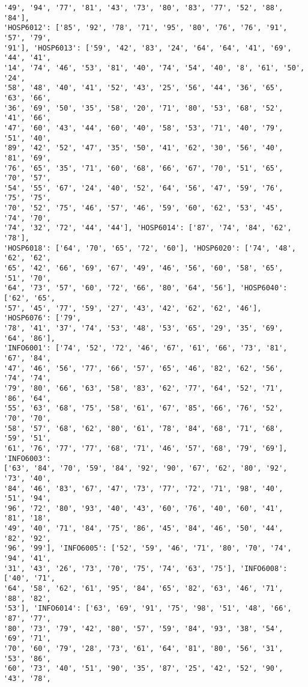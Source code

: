 \documentclass[11pt]{article}
\begin{document}
\begin{Verbatim}[commandchars=\\\{\}]
'49', '94', '77', '81', '43', '73', '80', '83', '77', '52', '88', '84'],
'HOSP6012': ['85', '92', '78', '71', '95', '80', '76', '76', '91', '57', '79',
'91'], 'HOSP6013': ['59', '42', '83', '24', '64', '64', '41', '69', '44', '41',
'14', '74', '46', '53', '81', '40', '74', '54', '40', '8', '61', '50', '24',
'58', '48', '40', '41', '52', '43', '25', '56', '44', '36', '65', '63', '66',
'36', '69', '50', '35', '58', '20', '71', '80', '53', '68', '52', '41', '66',
'47', '60', '43', '44', '60', '40', '58', '53', '71', '40', '79', '51', '40',
'89', '42', '52', '47', '35', '50', '41', '62', '30', '56', '40', '81', '69',
'76', '65', '35', '71', '60', '68', '66', '67', '70', '51', '65', '70', '57',
'54', '55', '67', '24', '40', '52', '64', '56', '47', '59', '76', '75', '75',
'70', '52', '75', '46', '57', '46', '59', '60', '62', '53', '45', '74', '70',
'74', '32', '72', '44', '44'], 'HOSP6014': ['87', '74', '84', '62', '78'],
'HOSP6018': ['64', '70', '65', '72', '60'], 'HOSP6020': ['74', '48', '62', '62',
'65', '42', '66', '69', '67', '49', '46', '56', '60', '58', '65', '51', '70',
'64', '73', '57', '60', '72', '66', '80', '64', '56'], 'HOSP6040': ['62', '65',
'57', '45', '77', '59', '27', '43', '42', '62', '62', '46'], 'HOSP6076': ['79',
'78', '41', '37', '74', '53', '48', '53', '65', '29', '35', '69', '64', '86'],
'INFO6001': ['74', '52', '72', '46', '67', '61', '66', '73', '81', '67', '84',
'47', '46', '56', '77', '66', '57', '65', '46', '82', '62', '56', '74', '74',
'79', '80', '66', '63', '58', '83', '62', '77', '64', '52', '71', '86', '64',
'55', '63', '68', '75', '58', '61', '67', '85', '66', '76', '52', '70', '70',
'58', '57', '68', '62', '80', '61', '78', '84', '68', '71', '68', '59', '51',
'61', '76', '77', '77', '68', '71', '46', '57', '68', '79', '69'], 'INFO6003':
['63', '84', '70', '59', '84', '92', '90', '67', '62', '80', '92', '73', '40',
'84', '46', '83', '67', '47', '73', '77', '72', '71', '98', '40', '51', '94',
'96', '72', '80', '93', '40', '43', '60', '76', '40', '60', '41', '81', '18',
'49', '40', '71', '84', '75', '86', '45', '84', '46', '50', '44', '82', '92',
'96', '99'], 'INFO6005': ['52', '59', '46', '71', '80', '70', '74', '94', '41',
'31', '43', '26', '73', '70', '75', '74', '63', '75'], 'INFO6008': ['40', '71',
'64', '58', '62', '61', '95', '84', '65', '82', '63', '46', '71', '88', '82',
'53'], 'INFO6014': ['63', '69', '91', '75', '98', '51', '48', '66', '87', '77',
'80', '73', '79', '42', '80', '57', '59', '84', '93', '38', '54', '69', '71',
'70', '60', '79', '28', '73', '61', '64', '81', '80', '56', '31', '53', '86',
'60', '73', '40', '51', '90', '35', '87', '25', '42', '52', '90', '43', '78',

\end{Verbatim}
\end{document}
